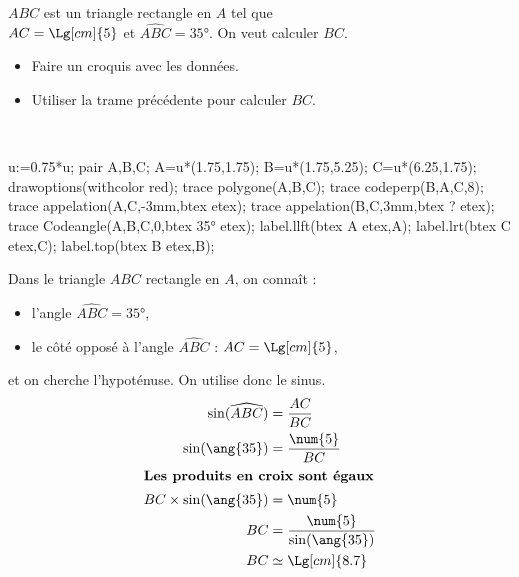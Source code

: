 \begin{exercice*}
    $ABC$ est un triangle rectangle en $A$ tel que\\ $AC=\Lg[cm]{5}$ et $\widehat{ABC}=\ang{35}$. On veut calculer $BC$.
    \begin{itemize}
        \item Faire un croquis avec les données.
        \item Utiliser la trame précédente pour calculer $BC$.
    \end{itemize}
\end{exercice*}
\begin{corrige}
    \phantom{rrr}\\
    \begin{center}
        \begin{Geometrie}[CoinHD={(5u,4.5u)},TypeTrace="MainLevee"]
            u:=0.75*u;            
            pair A,B,C;
            A=u*(1.75,1.75);
            B=u*(1.75,5.25);
            C=u*(6.25,1.75);
            drawoptions(withcolor red);
            trace polygone(A,B,C);            
            trace codeperp(B,A,C,8);
            trace appelation(A,C,-3mm,btex  etex);            
            trace appelation(B,C,3mm,btex ? etex);            
            trace Codeangle(A,B,C,0,btex \ang{35} etex);
            label.llft(btex A etex,A);
            label.lrt(btex C etex,C);
            label.top(btex B etex,B);
        \end{Geometrie}
    \end{center}
    {\red     
    Dans le triangle $ABC$ rectangle en $A$, on connaît :
    \begin{itemize}        
        \item l'angle $\widehat{ABC}=\ang{35}$,
        \item le côté opposé à l'angle $\widehat{ABC}$ : $AC=\Lg[cm]{5}$,
    \end{itemize}
    et on cherche l'hypoténuse. On utilise donc le sinus.
    \begin{align*}
        \sin(\widehat{ABC})&=\frac{AC}{BC}\\        
        \sin(\ang{35})&=\frac{\num{5}}{BC}\\        
        \intertext{\centering\bf Les produits en croix sont égaux}
        BC\times\sin(\ang{35})&=\num{5}\\
        BC&=\frac{\num{5}}{\sin(\ang{35})}\\
        BC&\simeq \Lg[cm]{8.7}
    \end{align*}
    }
\end{corrige}

